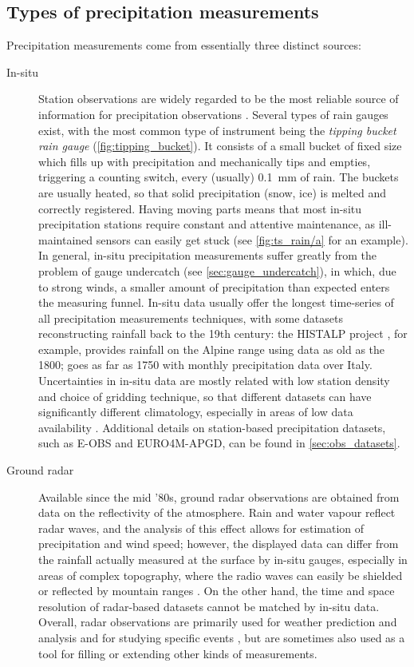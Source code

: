 \subsection{Types of precipitation measurements} \label{sec:types_pr_meas}
Precipitation measurements come from essentially three distinct sources:
\begin{description}
    \item[In-situ] Station observations are widely regarded to be the most reliable source of information for precipitation observations \citep{Hughes2006}. Several types of rain gauges exist, with the most common type of instrument being the \emph{tipping bucket rain gauge} (\cref{fig:tipping_bucket}). It consists of a small bucket of fixed size which fills up with precipitation and mechanically tips and empties, triggering a counting switch, every (usually) \SI{0.1}{\milli\metre} of rain. The buckets are usually heated, so that solid precipitation (snow, ice) is melted and correctly registered. Having moving parts means that most in-situ precipitation stations require constant and attentive maintenance, as ill-maintained sensors can easily get stuck (see \cref{fig:ts_rain/a} for an example). In general, in-situ precipitation measurements suffer greatly from the problem of gauge undercatch (see \cref{sec:gauge_undercatch}), in which, due to strong winds, a smaller amount of precipitation than expected enters the measuring funnel. In-situ data usually offer the longest time-series of all precipitation measurements techniques, with some datasets reconstructing rainfall back to the 19th century: the HISTALP project \citep{Auer2007}, for example, provides rainfall on the Alpine range using data as old as the 1800; \citep{Brunetti2006} goes as far as 1750 with monthly precipitation data over Italy. Uncertainties in in-situ data are mostly related with low station density and choice of gridding technique, so that different datasets can have significantly different climatology, especially in areas of low data availability \citep{Prein2017}. Additional details on station-based precipitation datasets, such as E-OBS and EURO4M-APGD, can be found in \cref{sec:obs_datasets}.
    \item[Ground radar] Available since the mid ’80s, ground radar observations are obtained from data on the reflectivity of the atmosphere. Rain and water vapour reflect radar waves, and the analysis of this effect allows for estimation of precipitation and wind speed; however, the displayed data can differ from the rainfall actually measured at the surface by in-situ gauges, especially in areas of complex topography, where the radio waves can easily be shielded or reflected by mountain ranges \citep{Germann2006, Wuest2010}. On the other hand, the time and space resolution of radar-based datasets cannot be matched by in-situ data. Overall, radar observations are primarily used for weather prediction and analysis and for studying specific events \citep[e.g.][]{Bertato2003}, but are sometimes also used as a tool for filling or extending other kinds of measurements.

\end{description}
